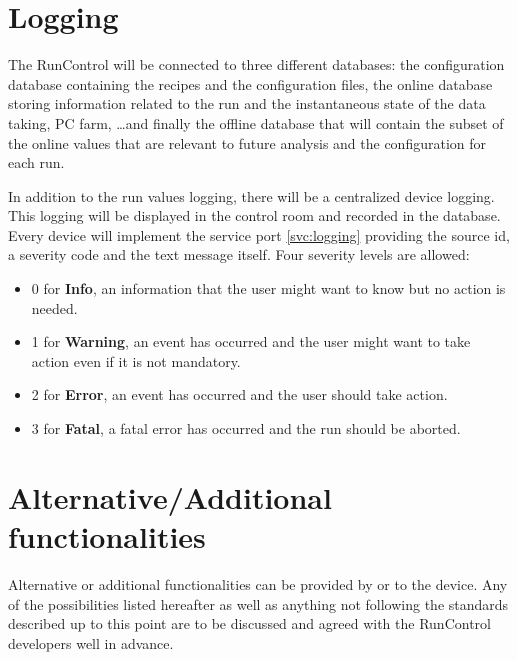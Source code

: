 \documentclass[a4paper]{article}
\begin{document}
\section{Logging}\label{sec:logging}
The RunControl will be connected to three different databases: the configuration database containing
the recipes and the configuration files, the online database storing information related to the
run and the instantaneous state of the data taking, PC farm, \ldots and finally the offline
database that will contain the subset of the online values that are relevant to future analysis and
the configuration for each run. 


In addition to the run values logging, there will be a centralized device logging. This logging will
be displayed in the control room and recorded in the database. Every device will implement the
service port \ref{svc:logging} providing the source id, a severity code and the
text message itself. Four severity levels are allowed:
\begin{itemize}
  \item 0 for \textbf{Info}, an information that the user might want to know but
  no action is needed.
  \item 1 for \textbf{Warning}, an event has occurred and the user might want to
  take action even if it is not mandatory.
  \item 2 for \textbf{Error}, an event has occurred and the user should take
  action.
  \item 3 for \textbf{Fatal}, a fatal error has occurred and the run should be
  aborted.
\end{itemize}

\section{Alternative/Additional functionalities}
Alternative or additional functionalities can be provided by or to the device. Any of the
possibilities listed hereafter as well as anything not following the standards described
up to this point are to be discussed and agreed with the RunControl developers well in advance.
\end{document}

